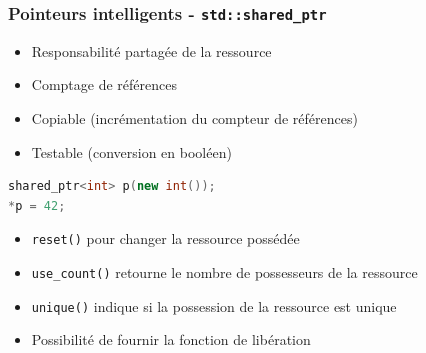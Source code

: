\documentclass[C++.tex]{subfiles}
\begin{document}
\begin{frame}[fragile]
	\frametitle{Pointeurs intelligents - \lstinline|std::shared_ptr|}
	\begin{itemize}
		\item Responsabilité partagée de la ressource
		\item Comptage de références
		\item Copiable (incrémentation du compteur de références)
		\item Testable (conversion en booléen)
	\end{itemize}

	\begin{lstlisting}[language=C++]
shared_ptr<int> p(new int());
*p = 42;\end{lstlisting}

	\begin{itemize}
		\item \lstinline|reset()| pour changer la ressource possédée


		\item \lstinline|use_count()| retourne le nombre de possesseurs de la ressource
		\item \lstinline|unique()| indique si la possession de la ressource est unique
		\item Possibilité de fournir la fonction de libération
	\end{itemize}
\end{frame}
\end{document}
